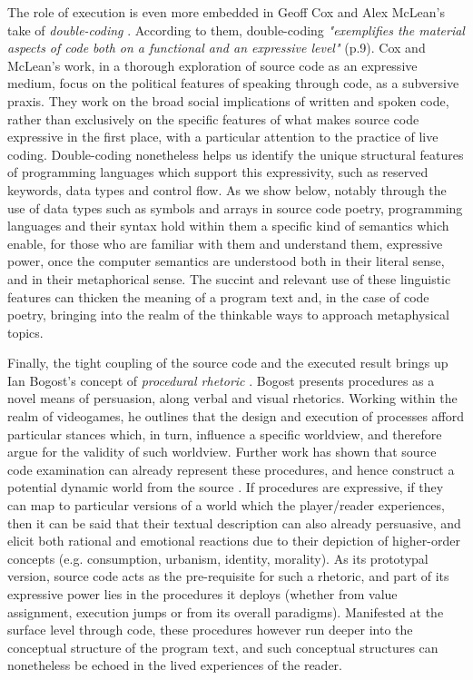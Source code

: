 The role of execution is even more embedded in Geoff Cox and Alex McLean's take of \emph{double-coding} \citep{cox_speaking_2013}. According to them, double-coding \emph{"exemplifies the material aspects of code both on a functional and an expressive level"} (p.9). Cox and McLean's work, in a thorough exploration of source code as an expressive medium, focus on the political features of speaking through code, as a subversive praxis. They work on the broad social implications of written and spoken code, rather than exclusively on the specific features of what makes source code expressive in the first place, with a particular attention to the practice of live coding. Double-coding nonetheless helps us identify the unique structural features of programming languages which support this expressivity, such as reserved keywords, data types and control flow. As we show below, notably through the use of data types such as symbols and arrays in source code poetry, programming languages and their syntax hold within them a specific kind of semantics which enable, for those who are familiar with them and understand them, expressive power, once the computer semantics are understood both in their literal sense, and in their metaphorical sense. The succint and relevant use of these linguistic features can thicken the meaning of a program text and, in the case of code poetry, bringing into the realm of the thinkable ways to approach metaphysical topics.

Finally, the tight coupling of the source code and the executed result brings up Ian Bogost's concept of \emph{procedural rhetoric} \citep{bogost_rhetoric_2008}. Bogost presents procedures as a novel means of persuasion, along verbal and visual rhetorics. Working within the realm of videogames, he outlines that the design and execution of processes afford particular stances which, in turn, influence a specific worldview, and therefore argue for the validity of such worldview. Further work has shown that source code examination can already represent these procedures, and hence construct a potential dynamic world from the source \citep{tirrell_dumb_2012,brock_rhetorical_2019}. If procedures are expressive, if they can map to particular versions of a world which the player/reader experiences, then it can be said that their textual description can also already persuasive, and elicit both rational and emotional reactions due to their depiction of higher-order concepts (e.g. consumption, urbanism, identity, morality). As its prototypal version, source code acts as the pre-requisite for such a rhetoric, and part of its expressive power lies in the procedures it deploys (whether from value assignment, execution jumps or from its overall paradigms). Manifested at the surface level through code, these procedures however run deeper into the conceptual structure of the program text, and such conceptual structures can nonetheless be echoed in the lived experiences of the reader.

